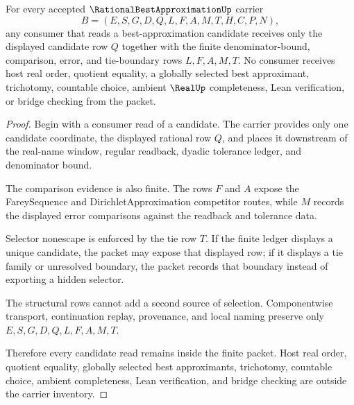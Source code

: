 \begin{theorem}
\label{thm:rational-best-approximation-selector-nonescape}
For every accepted $\RationalBestApproximationUp$ carrier
$$
B=(E,S,G,D,Q,L,F,A,M,T,H,C,P,N),
$$
any consumer that reads a best-approximation candidate receives only the displayed candidate row $Q$ together with the finite denominator-bound, comparison, error, and tie-boundary rows $L,F,A,M,T$. No consumer receives host real order, quotient equality, a globally selected best approximant, trichotomy, countable choice, ambient $\RealUp$ completeness, Lean verification, or bridge checking from the packet.
\end{theorem}
\begin{proof}
Begin with a consumer read of a candidate. The carrier provides only one candidate coordinate, the displayed rational row $Q$, and places it downstream of the real-name window, regular readback, dyadic tolerance ledger, and denominator bound.

The comparison evidence is also finite. The rows $F$ and $A$ expose the FareySequence and DirichletApproximation competitor routes, while $M$ records the displayed error comparisons against the readback and tolerance data.

Selector nonescape is enforced by the tie row $T$. If the finite ledger displays a unique candidate, the packet may expose that displayed row; if it displays a tie family or unresolved boundary, the packet records that boundary instead of exporting a hidden selector.

The structural rows cannot add a second source of selection. Componentwise transport, continuation replay, provenance, and local naming preserve only $E,S,G,D,Q,L,F,A,M,T$.

Therefore every candidate read remains inside the finite packet. Host real order, quotient equality, globally selected best approximants, trichotomy, countable choice, ambient completeness, Lean verification, and bridge checking are outside the carrier inventory.
\end{proof}


